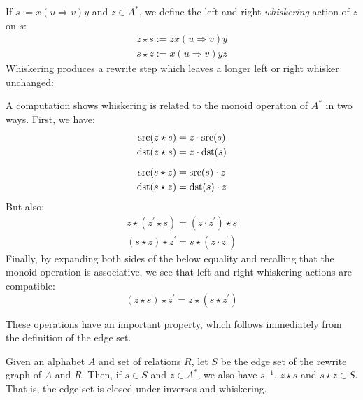 \documentclass[../generics]{subfiles}
\begin{document}
\begin{definition}
If $s:=x(u\Rightarrow v)y$ and $z\in A^*$, we define the left and right \emph{whiskering} action of $z$ on $s$:\index{$\star$}
\begin{gather*}
z\star s := zx(u\Rightarrow v)y\\
s\star z := x(u\Rightarrow v)yz
\end{gather*}
Whiskering produces a rewrite step which leaves a longer left or right whisker unchanged:
\begin{quote}
\end{quote}
A computation shows whiskering is related to the monoid operation of $A^*$ in two ways. First, we have:
\begin{gather*}
\operatorname{src}(z\star s)=z\cdot \operatorname{src}(s)\\
\operatorname{dst}(z\star s)=z\cdot \operatorname{dst}(s)\\[\medskipamount]
\operatorname{src}(s\star z)=\operatorname{src}(s)\cdot z\\
\operatorname{dst}(s\star z)=\operatorname{dst}(s)\cdot z
\end{gather*}
But also:
\begin{gather*}
z\star (z^\prime \star s)=(z\cdot z^\prime) \star s\\
(s\star z)\star z^\prime=s\star (z\cdot z^\prime)
\end{gather*}
Finally, by expanding both sides of the below equality and recalling that the monoid operation is associative, we see that left and right whiskering actions are compatible:
\[(z\star s)\star z^\prime = z\star(s\star z^\prime)\]
\end{definition}
These operations have an important property, which follows immediately from the definition of the edge set.
\begin{proposition}\label{edge set closed}
Given an alphabet $A$ and set of relations $R$, let $S$ be the edge set of the rewrite graph of $A$ and $R$. Then, if $s\in S$ and $z\in A^*$, we also have $s^{-1}$, $z\star s$ and $s\star z\in S$. That is, the edge set is closed under inverses and whiskering.
\end{proposition}
\end{document}
